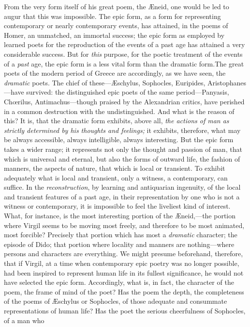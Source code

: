 From the very form itself of his great poem, the Æneid, one would be led
to augur that this was impossible. The epic form, as a form for
representing contemporary or nearly contemporary events, has attained,
in the poems of Homer, an unmatched, an immortal success; the epic form
as employed by learned poets for the reproduction of the events of a
past age has attained a very considerable success. But for \emph{this}
purpose, for the poetic treatment of the events of a \emph{past} age,
the epic form is a less vital form than the dramatic form.The great
poets of the modern period of Greece are accordingly, as we have seen,
the \emph{dramatic} poets. The chief of these---Æschylus, Sophocles,
Euripides, Aristophanes---have survived: the distinguished epic poets of
the same period---Panyasis, Chœrilus, Antimachus---though praised by the
Alexandrian critics, have perished in a common destruction with the
undistinguished. And what is the reason of this? It is, that the
dramatic form exhibits, above all, \emph{the actions of man as strictly
determined by his thoughts and feelings;} it exhibits, therefore, what
may be always accessible, always intelligible, always interesting. But
the epic form takes a wider range; it represents not only the thought
and passion of man, that which is universal and eternal, but also the
forms of outward life, the fashion of manners, the aspects of nature,
that which is local or transient. To exhibit adequately what is local
and transient, only a witness, a contemporary, can suffice. In the
\emph{reconstruction}, by learning and antiquarian ingenuity, of the
local and transient features of a past age, in their representation by
one who is not a witness or contemporary, it is impossible to feel the
liveliest kind of interest. What, for instance, is the most interesting
portion of the Æneid,---the portion where Virgil seems to be moving most
freely, and therefore to be most animated, most forcible? Precisely that
portion which has most a \emph{dramatic} character; the episode of Dido;
that portion where locality and manners are nothing---where persons and
characters are everything. We might presume beforehand, therefore, that
if Virgil, at a time when contemporary epic poetry was no longer
possible, had been inspired to represent human life in its fullest
significance, he would not have selected the epic form. Accordingly,
what is, in fact, the character of the poem, the frame of mind of the
poet? Has the poem the depth, the completeness of the poems of Æschylus
or Sophocles, of those adequate and consummate representations of human
life? Has the poet the serious cheerfulness of Sophocles, of a man who
